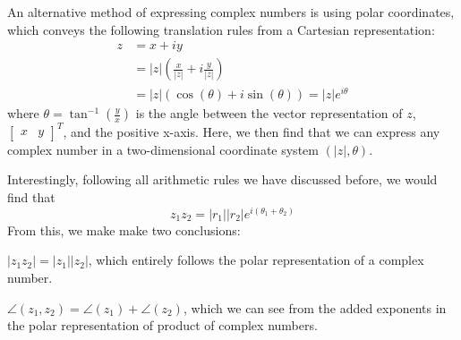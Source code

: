 An alternative method of expressing complex numbers is using polar coordinates, which conveys the following translation rules from a Cartesian representation:
\begin{align*}
    z &= x + i y \\
    &= |z| (\frac{x}{|z|} + i \frac{y}{|z|}) \\
    &= |z| (\cos(\theta) + i \sin(\theta)) = |z| e^{i \theta}
\end{align*}
where $\theta = \tan^{-1} (\frac{y}{x})$ is the angle between the vector representation of $z$, $\begin{bmatrix} x & y \end{bmatrix}^T$, and the positive x-axis.
Here, we then find that we can express any complex number in a two-dimensional coordinate system $(|z|, \theta)$.

Interestingly, following all arithmetic rules we have discussed before, we would find that
\[
    z_1 z_2 = |r_1||r_2| e^{i (\theta_1 + \theta_2)}
\]
From this, we make make two conclusions:
\begin{bindenum}
    \item $|z_1 z_2| = |z_1| |z_2|$, which entirely follows the polar representation of a complex number.
    \item $\angle (z_1, z_2) = \angle(z_1) + \angle(z_2)$, which we can see from the added exponents in the polar representation of product of complex numbers.
\end{bindenum}
